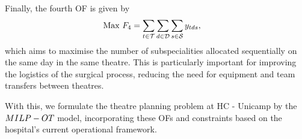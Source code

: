 \documentclass[review,3p,authoryear]{elsarticle}
\begin{document}
Finally, the fourth OF is given by
\begin{align}
\text{Max } \displaystyle F_4 & = \sum_{t \in \mathcal{T}} \sum_{d \in \mathcal{D}} \sum_{s \in \mathcal{S}} y_{tds}, \label{eq:f3}
\end{align}
which aims to maximise the number of subspecialities allocated sequentially on the same day in the same theatre.
This is particularly important for improving the logistics of the surgical process, reducing the need for equipment and team transfers between theatres.

With this, we formulate the theatre planning problem at HC - Unicamp by the $MILP-OT$ model, incorporating these OFs and constraints based on the hospital's current operational framework.
\end{document}
